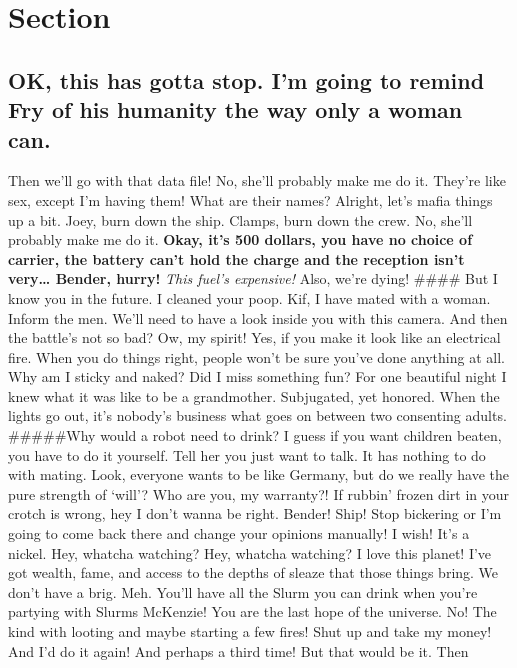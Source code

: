 \documentclass[]{report}
\begin{document}
\section{Section}\label{section-2.2}

\subsection{OK, this has gotta stop. I'm going to remind Fry of his
humanity the way only a woman
can.}\label{ok-this-has-gotta-stop.-im-going-to-remind-fry-of-his-humanity-the-way-only-a-woman-can.}

Then we'll go with that data file! No, she'll probably make me do it.
They're like sex, except I'm having them! What are their names? Alright,
let's mafia things up a bit. Joey, burn down the ship. Clamps, burn down
the crew. No, she'll probably make me do it. \textbf{Okay, it's 500
dollars, you have no choice of carrier, the battery can't hold the
charge and the reception isn't very\ldots{} Bender, hurry!} \emph{This
fuel's expensive!} Also, we're dying! \#\#\#\# But I know you in the
future. I cleaned your poop. Kif, I have mated with a woman. Inform the
men. We'll need to have a look inside you with this camera. And then the
battle's not so bad? Ow, my spirit! Yes, if you make it look like an
electrical fire. When you do things right, people won't be sure you've
done anything at all. Why am I sticky and naked? Did I miss something
fun? For one beautiful night I knew what it was like to be a
grandmother. Subjugated, yet honored. When the lights go out, it's
nobody's business what goes on between two consenting adults.
\#\#\#\#\#Why would a robot need to drink?\newline
I guess if you want children beaten, you have to do it yourself. Tell
her you just want to talk. It has nothing to do with mating. Look,
everyone wants to be like Germany, but do we really have the pure
strength of `will'? Who are you, my warranty?! If rubbin' frozen dirt in
your crotch is wrong, hey I don't wanna be right. Bender! Ship! Stop
bickering or I'm going to come back there and change your opinions
manually! I wish! It's a nickel. Hey, whatcha watching? Hey, whatcha
watching? I love this planet! I've got wealth, fame, and access to the
depths of sleaze that those things bring. We don't have a brig. Meh.
You'll have all the Slurm you can drink when you're partying with Slurms
McKenzie! You are the last hope of the universe. No! The kind with
looting and maybe starting a few fires! Shut up and take my money! And
I'd do it again! And perhaps a third time! But that would be it. Then
\end{document}
